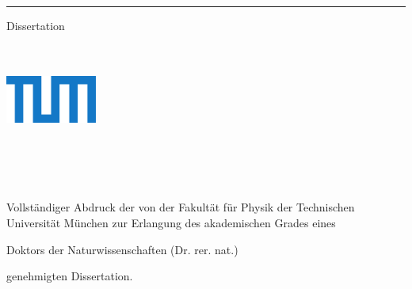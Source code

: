 %
\begin{titlepage}
	\flushright
	\hfill
	\vfill
	{\LARGE\thesisTitle \par}
	\rule[5pt]{\textwidth}{.4pt} \par
	{\Large\thesisName}
	\vfill
	{\large Dissertation}
\end{titlepage}


\begin{titlepage}
	\tgherosfont
	\centering

	{\Large \thesisUniversity} \\[2mm]
	{\large \thesisUniversityFaculty}\\[4mm]
	\includegraphics[width=3cm]{figures/design/TUM_Logo_blau_cmyk_pdf.pdf} \\[4mm]
	{\large \thesisInstitute}\\[2mm]
	{\large \thesisInstituteSubtitle}\\[4mm]

	\vfill
	{\LARGE \color{ctcolortitle}\textbf{\thesisTitle} \\[10mm]}
	{\Large \thesisName} \\


	\vfill

	{\large Vollständiger Abdruck der von der Fakultät für Physik der Technischen Universität München zur Erlangung des akademischen Grades eines \\[4mm]}

	{\Large Doktors der Naturwissenschaften (Dr. rer. nat.) \\[4mm]}

	{\large genehmigten Dissertation.}


\end{titlepage}
